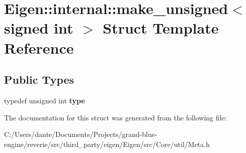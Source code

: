 \hypertarget{struct_eigen_1_1internal_1_1make__unsigned_3_01signed_01int_01_4}{}\section{Eigen\+::internal\+::make\+\_\+unsigned$<$ signed int $>$ Struct Template Reference}
\label{struct_eigen_1_1internal_1_1make__unsigned_3_01signed_01int_01_4}
\subsection*{Public Types}
\begin{DoxyCompactItemize}
\item 
\mbox{\label{struct_eigen_1_1internal_1_1make__unsigned_3_01signed_01int_01_4_a8f06c4afc42faa318ca247e71ae694e4}} 
typedef unsigned int {\bfseries type}
\end{DoxyCompactItemize}


The documentation for this struct was generated from the following file\+:\begin{DoxyCompactItemize}
\item 
C\+:/\+Users/dante/\+Documents/\+Projects/grand-\/blue-\/engine/reverie/src/third\+\_\+party/eigen/\+Eigen/src/\+Core/util/Meta.\+h\end{DoxyCompactItemize}
